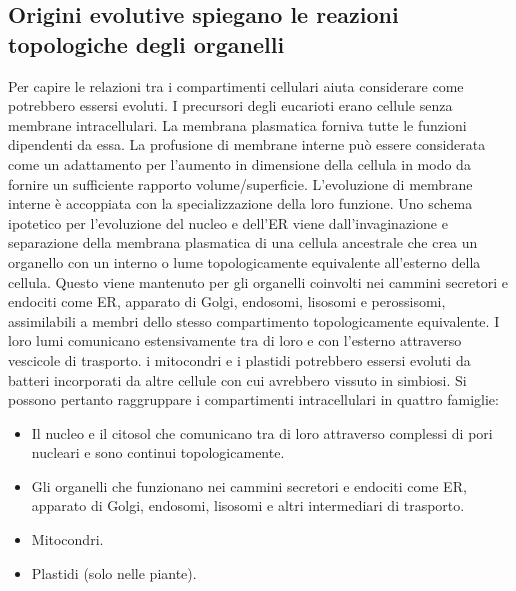 \subsection{Origini evolutive spiegano le reazioni topologiche degli organelli}
Per capire le relazioni tra i compartimenti cellulari aiuta considerare come potrebbero essersi evoluti. I precursori degli eucarioti erano cellule senza membrane intracellulari. La
membrana plasmatica forniva tutte le funzioni dipendenti da essa. La profusione di membrane interne pu\`o essere considerata come un adattamento per l'aumento in dimensione della
cellula in modo da fornire un sufficiente rapporto volume/superficie. L'evoluzione di membrane interne \`e accoppiata con la specializzazione della loro funzione. Uno schema ipotetico
per l'evoluzione del nucleo e dell'ER viene dall'invaginazione e separazione della membrana plasmatica di una cellula ancestrale che crea un organello con un interno o lume 
topologicamente equivalente all'esterno della cellula. Questo viene mantenuto per gli organelli coinvolti nei cammini secretori e endociti come ER, apparato di Golgi, endosomi, 
lisosomi e perossisomi, assimilabili a membri dello stesso compartimento topologicamente equivalente. I loro lumi comunicano estensivamente tra di loro e con l'esterno attraverso
vescicole di trasporto. i mitocondri e i plastidi potrebbero essersi evoluti da batteri incorporati da altre cellule con cui avrebbero vissuto in simbiosi. Si possono pertanto 
raggruppare i compartimenti intracellulari in quattro famiglie:
\begin{itemize}
	\item Il nucleo e il citosol che comunicano tra di loro attraverso complessi di pori nucleari e sono continui topologicamente.
	\item Gli organelli che funzionano nei cammini secretori e endociti come ER, apparato di Golgi, endosomi, lisosomi e altri intermediari di trasporto.
	\item Mitocondri.
	\item Plastidi (solo nelle piante).
\end{itemize}
